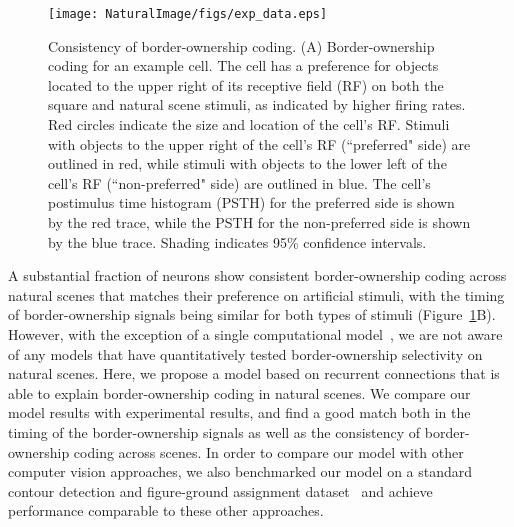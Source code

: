 \begin{figure}[t!]
\centering
\texttt{[image: NaturalImage/figs/exp\_data.eps]}
\makeatletter
\let\@currsize\normalsize
\caption[Consistency of border-ownership coding]{Consistency of border-ownership coding. (A) Border-ownership coding for an example cell. The cell has a preference for objects located to the upper right of its receptive field (RF) on both the square and natural scene stimuli, as indicated by higher firing rates. Red circles indicate the size and location of the cell's RF. Stimuli with objects to the upper right of the cell's RF (``preferred" side) are outlined in red, while stimuli with objects to the lower left of the cell's RF (``non-preferred" side) are outlined in blue. The cell's postimulus time histogram (PSTH) for the preferred side is shown by the red trace, while the PSTH for the non-preferred side is shown by the blue trace. Shading indicates 95\% confidence intervals.}
\label{Fig:experiments}
\end{figure}

A substantial fraction of neurons show consistent border-ownership coding across natural scenes that matches their preference on artificial stimuli, with the timing of border-ownership signals being similar for both types of stimuli (Figure~\ref{Fig:experiments}B). However, with the exception of a single computational model~\citep{Sakai_etal12}, we are not aware of any models that have quantitatively tested border-ownership selectivity on natural scenes. Here, we propose a model based on recurrent connections that is able to explain border-ownership coding in natural scenes. We compare our model results with experimental results, and find a good match both in the timing of the border-ownership signals as well as the consistency of border-ownership coding across scenes.
In order to compare our model with other computer vision approaches, we also benchmarked our model on a standard contour detection and figure-ground assignment dataset~\citep{Martin_etal01} and achieve performance comparable to these other approaches.


